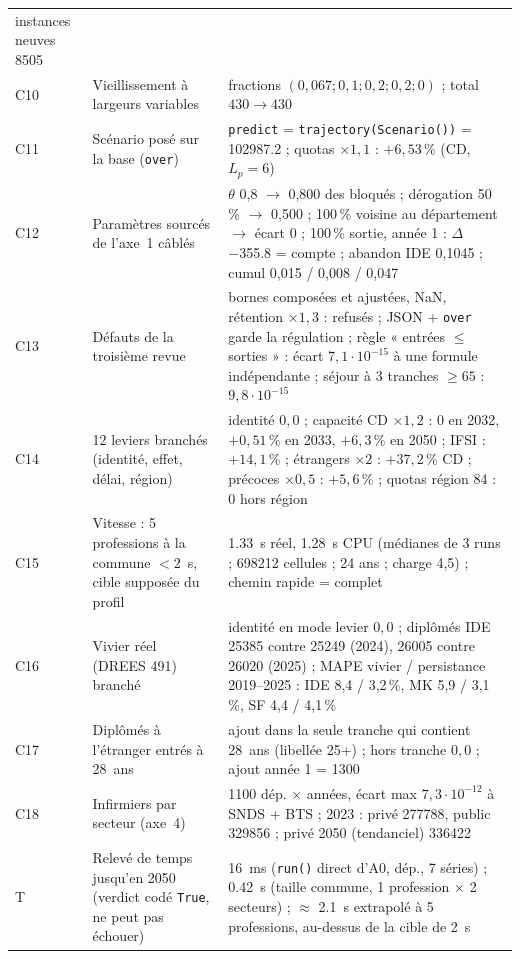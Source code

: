 {\begin{longtable}{@{}lp{5.2cm}p{8.0cm}@{}}
  instances neuves \num{8505} \\
C10 & Vieillissement à largeurs variables & fractions $(0{,}067 ; 0{,}1 ; 0{,}2 ; 0{,}2 ; 0)$ ; total
  $430 \to 430$ \\
C11 & Scénario posé sur la base (\texttt{over}) & \texttt{predict} = \texttt{trajectory(Scenario())} =
  \num{102987.2} ; quotas $\times 1{,}1$ : $+6{,}53$\,\% (CD, $L_p = 6$\suppose{}) \\
C12 & Paramètres sourcés de l'axe~1 câblés & $\theta$ 0,8 $\to$ 0,800 des bloqués ; dérogation 50\,\% $\to$
  0,500 ; 100\,\% voisine au département $\to$ écart 0 ; 100\,\% sortie, année 1 : $\Delta$ \num{-355.8} =
  compte ; abandon IDE 0,1045\derive{} ; cumul 0,015 / 0,008 / 0,047 \\
C13 & Défauts de la troisième revue & bornes composées et ajustées, NaN, rétention $\times 1{,}3$ : refusés ;
  JSON + \texttt{over} garde la régulation ; règle « entrées $\le$ sorties » : écart $7{,}1\cdot10^{-15}$ à une
  formule indépendante ; séjour à 3 tranches $\ge 65$ : $9{,}8\cdot10^{-15}$ \\
C14 & 12 leviers branchés (identité, effet, délai, région) & identité $0{,}0$ ; capacité CD $\times 1{,}2$ : 0 en
  2032, $+0{,}51$\,\% en 2033, $+6{,}3$\,\% en 2050 ; IFSI : $+14{,}1$\,\% ; étrangers $\times 2$ : $+37{,}2$\,\%
  CD ; précoces $\times 0{,}5$ : $+5{,}6$\,\% ; quotas région 84 : 0 hors région \\
C15 & Vitesse : 5 professions à la commune $< 2$~s, cible supposée du profil\suppose{} & \SI{1.33}{\second} réel, \SI{1.28}{\second}
  CPU (médianes de 3 runs ; \num{698212} cellules ; 24 ans ; charge 4,5) ; chemin rapide = complet \\
C16 & Vivier réel (DREES 491) branché & identité en mode levier $0{,}0$ ; diplômés IDE \num{25385} contre
  \num{25249} (2024), \num{26005} contre \num{26020} (2025) ; MAPE vivier / persistance 2019--2025 : IDE 8,4 /
  3,2\,\%, MK 5,9 / 3,1\,\%, SF 4,4 / 4,1\,\% \\
C17 & Diplômés à l'étranger entrés à 28~ans & ajout dans la seule tranche qui contient 28~ans (libellée
  25+) ; hors tranche $0{,}0$ ; ajout année 1 = \num{1300} \\
C18 & Infirmiers par secteur (axe~4) & \num{1100} dép. $\times$ années, écart max $7{,}3\cdot10^{-12}$ à SNDS +
  BTS ; 2023 : privé \num{277788}, public \num{329856} ; privé 2050 (tendanciel) \num{336422} \\
T & Relevé de temps jusqu'en 2050 (verdict codé \texttt{True}, ne peut pas échouer) & \SI{16}{\milli\second}
  (\texttt{run()} direct d'A0, dép., 7 séries) ; \SI{0.42}{\second} (taille commune, 1 profession $\times$ 2
  secteurs) ; $\approx$ \SI{2.1}{\second}\derive{} extrapolé à 5 professions, au-dessus de la cible de 2~s \\
\end{longtable}
}

